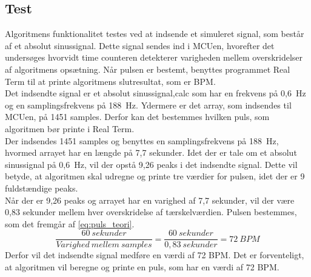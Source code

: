 \subsection{Test}
Algoritmens funktionalitet testes ved at indsende et simuleret signal, som består af et absolut sinussignal. Dette signal sendes ind i MCUen, hvorefter det undersøges hvorvidt time counteren detekterer varigheden mellem overskridelser af algoritmens opsætning. Når pulsen er bestemt, benyttes programmet Real Term til at printe algoritmens slutresultat, som er BPM. \\
Det indsendte signal er et absolut sinussignal,calc som har en frekvens på 0,6~Hz og en samplingsfrekvens på 188~Hz. Ydermere er det array, som indsendes til MCUen, på 1451 samples. Derfor kan det bestemmes hvilken puls, som algoritmen bør printe i Real Term. \\
Der indsendes 1451 samples og benyttes en samplingsfrekvens på 188~Hz, hvormed arrayet har en længde på 7,7 sekunder. Idet der er tale om et absolut sinussignal på 0,6~Hz, vil der opstå 9,26 peaks i det indsendte signal. Dette vil betyde, at algoritmen skal udregne og printe tre værdier for pulsen, idet der er 9 fuldstændige peaks. \\
Når der er 9,26 peaks og arrayet har en varighed af 7,7 sekunder, vil der være 0,83 sekunder mellem hver overskridelse af tærskelværdien. Pulsen bestemmes, som det fremgår af \eqref{eq:puls_teori}.
\begin{equation}
\frac{60~sekunder}{Varighed~mellem~samples} = \frac{60~sekunder}{0,83~sekunder} = 72~BPM
\label{eq:puls_teori}
\end{equation} 
Derfor vil det indsendte signal medføre en værdi af 72 BPM. Det er forventeligt, at algoritmen vil beregne og printe en puls, som har en værdi af 72 BPM.

